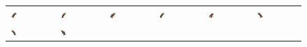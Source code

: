 \documentclass[book.tex]{subfiles}
\begin{document}
\begin{figure}[H]
\begin{table}[H]
\begin{tabularx}{\textwidth}[c]{|XXXXXX|}
  \includegraphics[width=0.18\textwidth]{screenshots_300dpi/game/sprite3e.png} &
  \includegraphics[width=0.18\textwidth]{screenshots_300dpi/game/sprite3f.png} &
  \includegraphics[width=0.18\textwidth]{screenshots_300dpi/game/sprite3g.png} & 
  \includegraphics[width=0.18\textwidth]{screenshots_300dpi/game/sprite3h.png} &   
  \includegraphics[width=0.18\textwidth]{screenshots_300dpi/game/sprite4a.png} &
  \includegraphics[width=0.18\textwidth]{screenshots_300dpi/game/sprite4b.png} \\    
  \includegraphics[width=0.18\textwidth]{screenshots_300dpi/game/sprite4c.png} &
  \includegraphics[width=0.18\textwidth]{screenshots_300dpi/game/sprite4d.png} &

\end{tabularx}
\end{table}
\end{figure}
\end{document}
